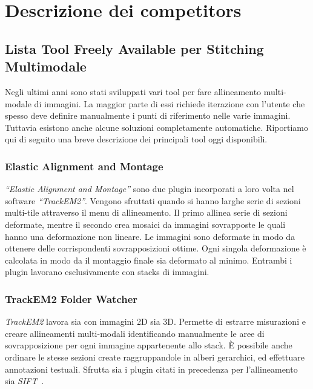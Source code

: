 \chapter{Descrizione dei competitors}
\label{chap:competitors}

\section{Lista Tool Freely Available per Stitching Multimodale}
\frenchspacing
\noindent Negli ultimi anni sono stati sviluppati vari tool per fare allineamento multi-modale di immagini. La maggior parte di essi richiede iterazione con l’utente che spesso deve definire manualmente i punti di riferimento nelle varie immagini. Tuttavia esistono anche alcune soluzioni completamente automatiche. Riportiamo qui di seguito una breve descrizione dei principali tool oggi disponibili.

\subsection{Elastic Alignment and Montage}
\noindent \textit{``Elastic Alignment and Montage''} sono due plugin incorporati a loro volta nel software \textit{``TrackEM2''}. Vengono sfruttati quando si hanno larghe serie di sezioni multi-tile attraverso il menu di allineamento. Il primo allinea serie di sezioni deformate, mentre il secondo crea mosaici da immagini sovrapposte le quali hanno una deformazione non lineare. Le immagini sono deformate in modo da ottenere delle corrispondenti sovrapposizioni ottime. Ogni singola deformazione è calcolata in modo da il montaggio finale sia deformato al minimo. Entrambi i plugin lavorano esclusivamente con stacks di immagini.

\subsection{TrackEM2 Folder Watcher}
\noindent \textit{TrackEM2} lavora sia con immagini 2D sia 3D. Permette di estrarre misurazioni e creare allineamenti multi-modali identificando manualmente le aree di sovrapposizione per ogni immagine appartenente allo stack. È possibile anche ordinare le stesse sezioni create raggruppandole in alberi gerarchici, ed effettuare annotazioni testuali.
Sfrutta sia i plugin citati in precedenza per l'allineamento sia \textit{SIFT}~\cite{10.1371/journal.pone.0038011}.

